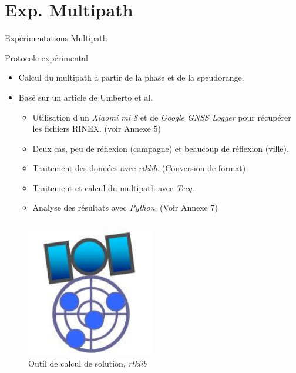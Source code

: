 \documentclass[xcolor=dvipsnames,envcountsect]{beamer}
\begin{document}
\section{Exp. Multipath}
\begin{frame}
	\centering
	\begin{block}
		\scshape
		\begin{center}
			\Huge Expérimentations Multipath
		\end{center}
	\end{block}
\end{frame}

\begin{frame}{Protocole expérimental}
	\begin{itemize}
		\item Calcul du multipath à partir de la phase et de la speudorange.
		\item Basé sur un article de Umberto et al. \cite{mi8}
		\begin{itemize}
			\item Utilisation d'un \textit{Xiaomi mi 8} et de \textit{Google GNSS Logger} pour récupérer les fichiers RINEX. {\tiny (voir Annexe 5)}
			\item Deux cas, peu de réflexion (campagne) et beaucoup de réflexion (ville).
			\item Traitement des données avec \textit{rtklib}. (Conversion de format)
			\item Traitement et calcul du multipath avec \textit{Tecq}.
			\item Analyse des résultats avec \textit{Python}. {\tiny (Voir Annexe 7)}
		\end{itemize}
	\end{itemize}
	\begin{columns}
		\begin{column}{0.3\textwidth}
			\begin{figure}
				\centering
				\includegraphics[width=0.5\textwidth]{./Figures/rtklib.jpg}
				\caption {Outil de calcul de solution, \textit{rtklib}}
			\end{figure}		
		\end{column}


\end{columns}
\end{frame}
\end{document}
